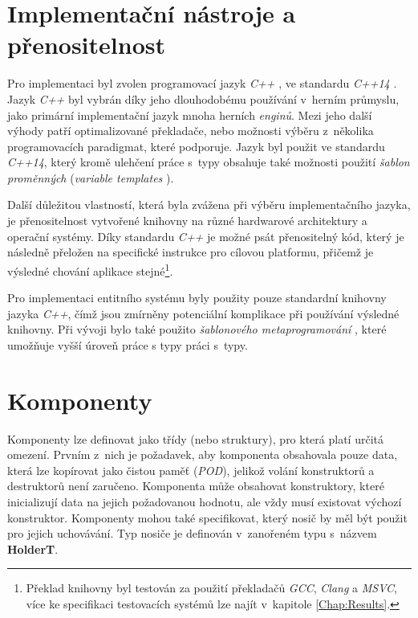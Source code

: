 \section{Implementační nástroje a přenositelnost}

Pro implementaci byl zvolen programovací jazyk \emph{C++} \cite{IsoCpp}, ve standardu \emph{C++14} \cite{Cpp14}. Jazyk \emph{C++} byl vybrán díky jeho dlouhodobému používání v~herním průmyslu, jako primární implementační jazyk mnoha herních \emph{enginů}. Mezi jeho další výhody patří optimalizované překladače, nebo možnosti výběru z~několika programovacích paradigmat, které podporuje. Jazyk byl použit ve standardu \emph{C++14}, který kromě ulehčení práce s~typy obsahuje také možnosti použití \emph{šablon proměnných} (\emph{variable templates} \cite{Cpp14VarTemplate}). 

Další důležitou vlastností, která byla zvážena při výběru implementačního jazyka, je přenositelnost vytvořené knihovny na různé hardwarové architektury a operační systémy. Díky standardu \emph{C++} je možné psát přenositelný kód, který je následně přeložen na specifické instrukce pro cílovou platformu, přičemž je výsledné chování aplikace stejné\footnote{Překlad knihovny byl testován za použití překladačů \emph{GCC}, \emph{Clang} a \emph{MSVC}, více ke specifikaci testovacích systémů lze najít v~kapitole \ref{Chap:Results}.}. 

Pro implementaci entitního systému byly použity pouze standardní knihovny jazyka \emph{C++}, čímž jsou zmírněny potenciální komplikace při používání výsledné knihovny. Při vývoji bylo také použito \emph{šablonového metaprogramování} \cite{CppMetaprogramming}, které umožňuje vyšší úroveň práce s typy práci s~typy.

\section{Komponenty}

Komponenty lze definovat jako třídy (nebo struktury), pro která platí určitá omezení. Prvním z~nich je požadavek, aby komponenta obsahovala pouze data, která lze kopírovat jako čistou paměť (\emph{POD}), jelikož volání konstruktorů a destruktorů není zaručeno. Komponenta může obsahovat konstruktory, které inicializují data na jejich požadovanou hodnotu, ale vždy musí existovat výchozí konstruktor. Komponenty mohou také specifikovat, který nosič by měl být použit pro jejich uchovávání. Typ nosiče je definován v~zanořeném typu s~názvem \textbf{HolderT}.

